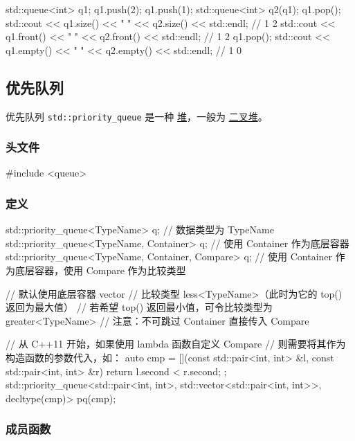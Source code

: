 \begin{codeline}
std::queue<int> q1;
q1.push(2);
q1.push(1);
std::queue<int> q2(q1);
q1.pop();
std::cout << q1.size() << " " << q2.size() << std::endl;    // 1 2
std::cout << q1.front() << " " << q2.front() << std::endl;  // 1 2
q1.pop();
std::cout << q1.empty() << " " << q2.empty() << std::endl;  // 1 0
\end{codeline}


\subsection{优先队列}\label{ux4f18ux5148ux961fux5217}

优先队列 \texttt{std::priority\_queue} 是一种 \href{../../ds/heap.md}{堆}，一般为 \href{../../ds/binary-heap.md}{二叉堆}。

\subsubsection{头文件}\label{ux5934ux6587ux4ef6-2}


\begin{codeline}
#include <queue>
\end{codeline}


\subsubsection{定义}\label{ux5b9aux4e49-2}


\begin{codeline}
std::priority_queue<TypeName> q;             // 数据类型为 TypeName
std::priority_queue<TypeName, Container> q;  // 使用 Container 作为底层容器
std::priority_queue<TypeName, Container, Compare> q;
// 使用 Container 作为底层容器，使用 Compare 作为比较类型

// 默认使用底层容器 vector
// 比较类型 less<TypeName>（此时为它的 top() 返回为最大值）
// 若希望 top() 返回最小值，可令比较类型为 greater<TypeName>
// 注意：不可跳过 Container 直接传入 Compare

// 从 C++11 开始，如果使用 lambda 函数自定义 Compare
// 则需要将其作为构造函数的参数代入，如：
auto cmp = [](const std::pair<int, int> &l, const std::pair<int, int> &r) {
  return l.second < r.second;
};
std::priority_queue<std::pair<int, int>, std::vector<std::pair<int, int>>,
                    decltype(cmp)>
    pq(cmp);
\end{codeline}


\subsubsection{成员函数}\label{ux6210ux5458ux51fdux6570-3}

